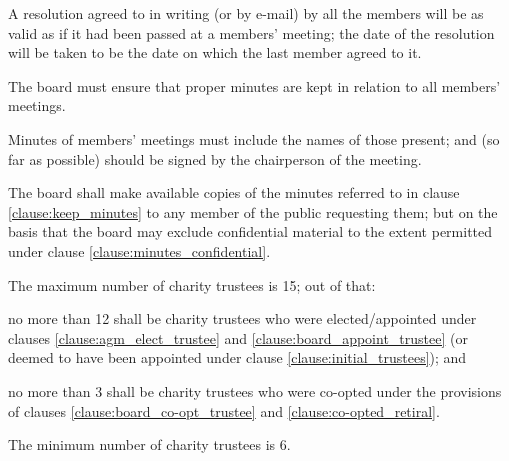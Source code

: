 ﻿\documentclass[a4paper,11pt,onecolumn ]{article}
\begin{document}
\begin{legal}
\item A resolution agreed to in writing (or by e-mail) by all the members will be as valid as if it had been passed at a members’ meeting; the date of the resolution will be taken to be the date on which the last member agreed to it.
\end{legal}

\begin{legal}
\item \label{clause:keep_minutes} The board must ensure that proper minutes are kept in relation to all members' meetings.
\item Minutes of members' meetings must include the names of those present; and (so far as possible) should be signed by the chairperson of the meeting.
\item The board shall make available copies of the minutes referred to in clause \ref{clause:keep_minutes} to any member of the public requesting them; but on the basis that the board may exclude confidential material to the extent permitted under clause \ref{clause:minutes_confidential}.
\end{legal}


\begin{legal}
\item \label{clause:max_trustees} The maximum number of charity trustees is 15; out of that:
    \begin{legal}
        \item no more than 12 shall be charity trustees who were elected\slash appointed under clauses \ref{clause:agm_elect_trustee} and \ref{clause:board_appoint_trustee} (or deemed to have been appointed under clause \ref{clause:initial_trustees}); and 
        \item no more than 3 shall be charity trustees who were co-opted under the provisions of clauses \ref{clause:board_co-opt_trustee} and \ref{clause:co-opted_retiral}.  
    \end{legal}
\item The minimum number of charity trustees is 6.
\end{legal}
\end{document}
